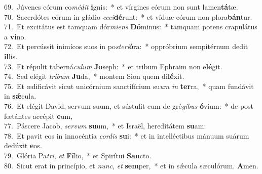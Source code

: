 {69.~}Júvenes eórum co\textit{mé}\textit{dit} \textbf{i}gnis:~* et vírgines eórum non sunt lamen\textbf{tá}tæ.\\
{70.~}Sacerdótes eórum in gládio \textit{ce}\textit{ci}\textbf{dé}runt:~* et víduæ eórum non plora\textbf{bán}tur.\\
{71.~}Et excitátus est tamquam dór\textit{mi}\textit{ens} \textbf{Dó}minus:~* tamquam potens crapulátus a \textbf{vi}no.\\
{72.~}Et percússit inimícos suos in po\textit{ste}\textit{ri}\textbf{ó}ra:~* oppróbrium sempitérnum dedit \textbf{il}lis.\\
{73.~}Et répulit taberná\textit{cu}\textit{lum} \textbf{Jo}seph:~* et tribum Ephraim non e\textbf{lé}git.\\
{74.~}Sed elégit \textit{tri}\textit{bum} \textbf{Ju}da,~* montem Sion quem di\textbf{lé}xit.\\
{75.~}Et ædificávit sicut unicórnium sanctifícium su\textit{um} \textit{in} \textbf{ter}ra,~* quam fundávit in \textbf{sǽ}cula.\\
{76.~}Et elégit David, servum suum, et sústulit eum de gré\textit{gi}\textit{bus} \textbf{ó}vium:~* de post fœtántes accépit \textbf{e}um,\\
{77.~}Páscere Jacob, \textit{ser}\textit{vum} \textbf{su}um,~* et Israël, hereditátem \textbf{su}am:\\
{78.~}Et pavit eos in innocéntia \textit{cor}\textit{dis} \textbf{su}i:~* et in intelléctibus mánuum suárum dedúxit \textbf{e}os.\\
{79.~}Glória Pa\textit{tri}, \textit{et} \textbf{Fí}lio,~* et Spirítui \textbf{San}cto.\\
{80.~}Sicut erat in princípio, et \textit{nunc}, \textit{et} \textbf{sem}per,~* et in sǽcula sæculórum. \textbf{A}men.\\
